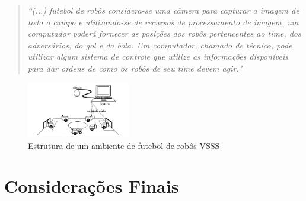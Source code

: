 \begin{quotation}
\textit{
``(...) futebol de robôs considera-se uma câmera para capturar
a imagem de todo o campo e utilizando-se de recursos de processamento de imagem, um
computador poderá fornecer as posições dos robôs pertencentes ao time, dos adversários,
do gol e da bola. Um computador, chamado de técnico, pode utilizar algum sistema de
controle que utilize as informações disponíveis para dar ordens de como os robôs de seu
time devem agir."}\cite{Faria2006}
\end{quotation}
 \begin{figure}[H]
	\centering
	\includegraphics[width=0.4\textwidth]{faria2006.png}
	\caption{Estrutura de um ambiente de futebol de robôs VSSS\cite{Faria2006}}
	\label{fig:VSSS}
\end{figure} 
\section{Considerações Finais}